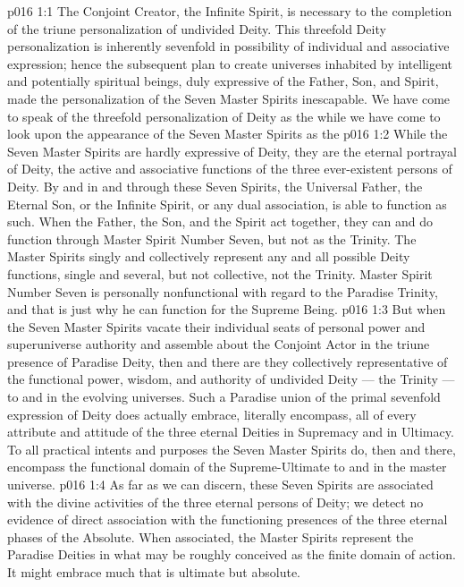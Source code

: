 \vs p016 1:1 The Conjoint Creator, the Infinite Spirit, is necessary to the completion of the triune personalization of undivided Deity. This threefold Deity personalization is inherently sevenfold in possibility of individual and associative expression; hence the subsequent plan to create universes inhabited by intelligent and potentially spiritual beings, duly expressive of the Father, Son, and Spirit, made the personalization of the Seven Master Spirits inescapable. We have come to speak of the threefold personalization of Deity as the  while we have come to look upon the appearance of the Seven Master Spirits as the 
\vs p016 1:2 While the Seven Master Spirits are hardly expressive of  Deity, they are the eternal portrayal of  Deity, the active and associative functions of the three ever\hyp{}existent persons of Deity. By and in and through these Seven Spirits, the Universal Father, the Eternal Son, or the Infinite Spirit, or any dual association, is able to function as such. When the Father, the Son, and the Spirit act together, they can and do function through Master Spirit Number Seven, but not as the Trinity. The Master Spirits singly and collectively represent any and all possible Deity functions, single and several, but not collective, not the Trinity. Master Spirit Number Seven is personally nonfunctional with regard to the Paradise Trinity, and that is just why he can function  for the Supreme Being.
\vs p016 1:3 But when the Seven Master Spirits vacate their individual seats of personal power and superuniverse authority and assemble about the Conjoint Actor in the triune presence of Paradise Deity, then and there are they collectively representative of the functional power, wisdom, and authority of undivided Deity --- the Trinity --- to and in the evolving universes. Such a Paradise union of the primal sevenfold expression of Deity does actually embrace, literally encompass, all of every attribute and attitude of the three eternal Deities in Supremacy and in Ultimacy. To all practical intents and purposes the Seven Master Spirits do, then and there, encompass the functional domain of the Supreme\hyp{}Ultimate to and in the master universe.
\vs p016 1:4 As far as we can discern, these Seven Spirits are associated with the divine activities of the three eternal persons of Deity; we detect no evidence of direct association with the functioning presences of the three eternal phases of the Absolute. When associated, the Master Spirits represent the Paradise Deities in what may be roughly conceived as the finite domain of action. It might embrace much that is ultimate but  absolute.
